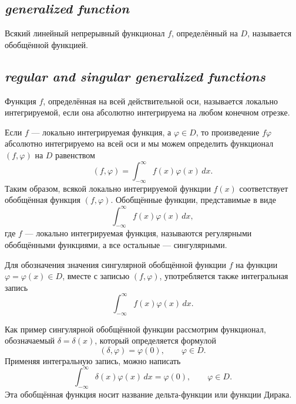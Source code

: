 \subsection*{ \textit{generalized function}}
\begin{rusblock}
Всякий линейный непрерывный функционал $f$, определённый на $D$, называется обобщённой функцией.
\end{rusblock}

\subsection*{ \textit{regular and singular generalized functions}}
\begin{rusblock}
Функция $f$, определённая на всей действительной оси, называется локально интегрируемой, если она абсолютно интегрируема на любом конечном отрезке.

Если $f$ --- локально интегрируемая функция, а $\varphi\in D$, то произведение $f\varphi$ абсолютно интегрируемо на всей оси и мы можем определить функционал $(f,\varphi)$ на $D$ равенством
\[
(f,\varphi)=\int_{-\infty}^{\infty}f(x)\varphi(x)\,dx.
\]
Таким образом, всякой локально интегрируемой функции $f(x)$ соответствует обобщённая функция $(f,\varphi)$. Обобщённые функции, представимые в виде
\[
\int_{-\infty}^{\infty}f(x)\varphi(x)\,dx,
\]
где $f$ --- локально интегрируемая функция, называются регулярными обобщёнными функциями, а все остальные --- сингулярными.

Для обозначения значения сингулярной обобщённой функции $f$ на функции $\varphi=\varphi(x)\in D$, вместе с записью $(f,\varphi)$, употребляется также интегральная запись
\[
\int_{-\infty}^{\infty}f(x)\varphi(x)\,dx.
\]
\end{rusblock}

\begin{rusblock}
Как пример сингулярной обобщённой функции рассмотрим функционал, обозначаемый $\delta=\delta(x)$, который определяется формулой
\[
(\delta,\varphi)=\varphi(0),\qquad \varphi\in D.
\]
Применяя интегральную запись, можно написать
\[
\int_{-\infty}^{\infty}\delta(x)\varphi(x)\,dx=\varphi(0),\qquad \varphi\in D.
\]
Эта обобщённая функция носит название дельта-функции или функции Дирака.
\end{rusblock}

